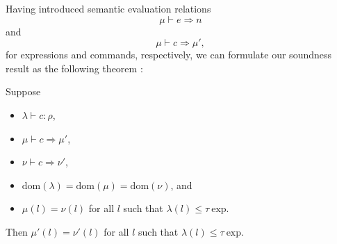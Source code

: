 \documentclass{llncs}
\newcommand{\lit}[1]{\mathrm{#1}}
\begin{document}
Having introduced semantic evaluation relations
\[
\mu \vdash e \Rightarrow n
\]
and
\[
\mu \vdash c \Rightarrow \mu',
\]
for expressions and commands, respectively, we can formulate our soundness result as the following theorem \cite{VolpanoIS96}:

\begin{theorem}[Soundness]
Suppose
\begin{itemize}
    \item $\lambda \vdash c : \rho$,
    \item $\mu \vdash c \Rightarrow \mu'$,
    \item $\nu \vdash c \Rightarrow \nu'$,
    \item $\lit{dom}(\lambda) = \lit{dom}(\mu) = \lit{dom}(\nu)$, and
    \item $\mu(l) = \nu(l)$ for all $l$ such that $\lambda(l) \leq \tau\ \lit{exp}$.
\end{itemize}
Then $\mu'(l) = \nu'(l)$ for all $l$ such that $\lambda(l) \leq \tau\ \lit{exp}$.
\end{theorem}


{}
\end{document}
